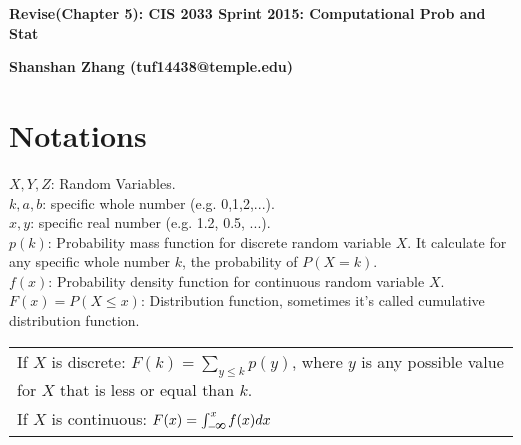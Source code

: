 \documentclass[11pt,epsfig]{article}
\def\infinity{\rotatebox{90}{8}}
\begin{document}
\textbf{Revise(Chapter 5): CIS 2033 Sprint 2015: Computational Prob and Stat}

\textbf{Shanshan Zhang {(tuf14438@temple.edu)} }


\section{Notations}
$X, Y, Z$: Random Variables.\\
$k,a,b$: specific whole number (e.g. 0,1,2,...). \\
$x,y$: specific real number (e.g. 1.2, 0.5, ...). \\
$p(k)$: Probability mass function for discrete random variable $X$. It calculate for any specific whole number $k$, the probability of $P(X=k)$.\\
$f(x)$: Probability density function for continuous random variable $X$.\\
$F(x)=P(X\le x)$: Distribution function, sometimes it's called cumulative distribution function.\\
\begin{tabular}{|l|}
\hline
If $X$ is discrete: $F(k) = \sum_{y\le k}p(y)$, where $y$ is any possible value for $X$ that is less or equal than $k$.\\
If $X$ is continuous: $F(x)=\int	^x_{-\infinity}f(x)dx$\\
\hline
\end{tabular}
 
\end{document}
